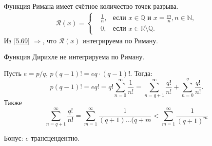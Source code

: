
Функция Римана имеет счётное количество точек разрыва. 
\begin{equation*}
\begin{split}
    \mathcal{R}(x) = \left\{
    \begin{aligned}
        &\frac{1}{n}, &\text{если } x \in \mathbb{Q} \text{ и } x = \frac{m}{n}, n \in \mathbb{N}, \\
        &0, &\text{если } x \in \mathbb{R} \setminus \mathbb{Q}.
    \end{aligned}
    \right.
\end{split}
\end{equation*}
Из \eqref{5.69} $\Rightarrow$, что $\mathcal{R}(x)$ интегрируема по Риману.

Функция Дирихле не интегрируема по Риману. 





Пусть $e = p/q$, $p (q-1)! = eq \cdot (q-1)!$. Тогда:
$$
p(q-1)! = e q! = q! \sum_{n=0}^{\infty} \frac{1}{n!} = \sum_{n=q+1}^{\infty} \frac{q!}{n!} + \sum_{n=0}^q \frac{q!}{n!}.
$$
Также 
$$
\sum_{n=q+1}^{\infty} \frac{q!}{n!} = \sum_{m=1}^{\infty} \frac{1}{(q+1) \ldots (q+m} < \sum_{m=1}^{\infty} \frac{1}{(q+1)^m}
$$

Бонус: $e$ трансцендентно. 




